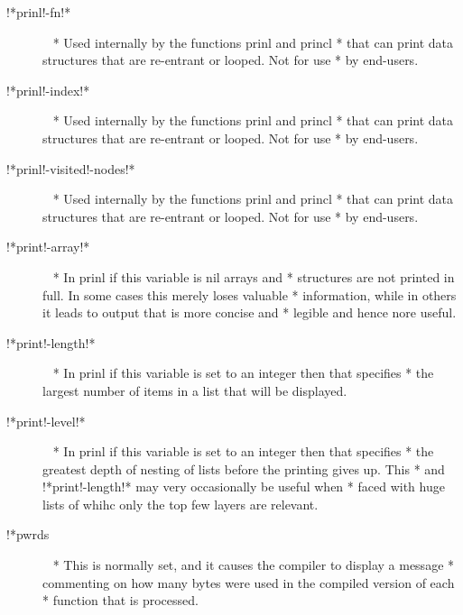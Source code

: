 \documentclass[a4paper,11pt]{article}
\begin{document}
\begin{description}
\item [{\ttfamily !*prinl!-fn!*}]  ~\newline
  * Used internally by the functions {\ttfamily prinl} and {\ttfamily princl}
  * that can print data structures that are re-entrant or looped. Not for use
  * by end-users.

\item [{\ttfamily !*prinl!-index!*}]  ~\newline
  * Used internally by the functions {\ttfamily prinl} and {\ttfamily princl}
  * that can print data structures that are re-entrant or looped. Not for use
  * by end-users.

\item [{\ttfamily !*prinl!-visited!-nodes!*}]  ~\newline
  * Used internally by the functions {\ttfamily prinl} and {\ttfamily princl}
  * that can print data structures that are re-entrant or looped. Not for use
  * by end-users.

\item [{\ttfamily !*print!-array!*}]  ~\newline
  * In {\ttfamily prinl} if this variable is {\ttfamily nil} arrays and
  * structures are not printed in full. In some cases this merely loses valuable
  * information, while in others it leads to output that is more concise and
  * legible and hence nore useful.

\item [{\ttfamily !*print!-length!*}]  ~\newline
  * In {\ttfamily prinl} if this variable is set to an integer then that specifies
  * the largest number of items in a list that will be displayed.

\item [{\ttfamily !*print!-level!*}]  ~\newline
  * In {\ttfamily prinl} if this variable is set to an integer then that specifies
  * the greatest depth of nesting of lists before the printing gives up. This
  * and {\ttfamily !*print!-length!*} may very occasionally be useful when
  * faced with huge lists of whihc only the top few layers are relevant.

\item [{\ttfamily !*pwrds}]  ~\newline
  * This is normally set, and it causes the compiler to display a message
  * commenting on how many bytes were used in the compiled version of each
  * function that is processed.


\end{description}
\end{document}
